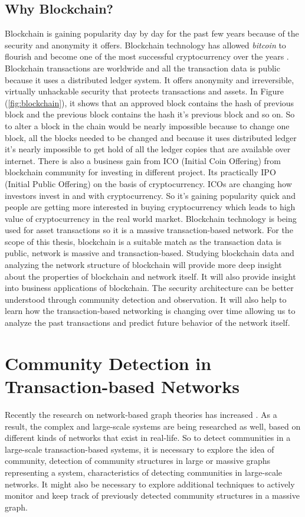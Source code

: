 \subsection{Why Blockchain?}
Blockchain is gaining popularity day by day for the past few years because of the security and anonymity it offers. Blockchain technology has allowed \textit{bitcoin} to flourish and become one of the most successful cryptocurrency over the years \cite{ref-41}. Blockchain transactions are worldwide and all the transaction data is public because it uses a distributed ledger system. It offers anonymity and irreversible, virtually unhackable security that protects transactions and assets. In Figure (\ref{fig:blockchain}), it shows that an approved block contains the hash of previous block and the previous block contains the hash it's previous block and so on. So to alter a block in the chain would be nearly impossible because to change one block, all the blocks needed to be changed and because it uses distributed ledger it's nearly impossible to get hold of all the ledger copies that are available over internet. There is also a business gain from ICO (Initial Coin Offering) from blockchain community for investing in different project. Its practically IPO (Initial Public Offering) on the basis of cryptocurrency. ICOs are changing how investors invest in and with cryptocurrency. So it's gaining popularity quick and people are getting more interested in buying cryptocurrency which leads to high value of cryptocurrency in the real world market. Blockchain technology is being used for asset transactions so it is a massive transaction-based network. For the scope of this thesis, blockchain is a suitable match as the transaction data is public, network is massive and transaction-based. Studying blockchain data and analyzing the network structure of blockchain will provide more deep insight about the properties of blockchain and network itself. It will also provide insight into business applications of blockchain. The security architecture can be better understood through community detection and observation. It will also help to learn how the transaction-based networking is changing over time allowing us to analyze the past transactions and predict future behavior of the network itself.

\section{Community Detection in Transaction-based Networks}
Recently the research on network-based graph theories has increased \cite{ref-1}. As a result, the complex and large-scale systems are being researched as well, based on different kinds of networks that exist in real-life. So to detect communities in a large-scale transaction-based systems, it is necessary to explore the idea of community, detection of community structures in large or massive graphs representing a system, characteristics of detecting communities in large-scale networks. It might also be necessary to explore additional techniques to actively monitor and keep track of previously detected community structures in a massive graph.

